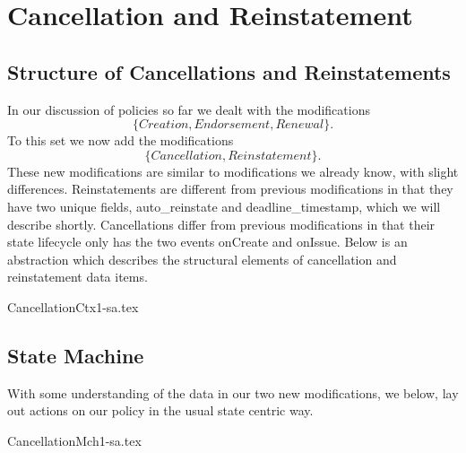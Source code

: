 \chapter{Cancellation and Reinstatement}
\label{intro} %


\section{Structure of Cancellations and Reinstatements}
\label{sec:02:1}
In our discussion of policies so far we dealt with the modifications
\begin{equation*}
  \{Creation, Endorsement, Renewal\}.
\end{equation*}
To this set we now add the modifications
\begin{equation*}
  \{Cancellation, Reinstatement\}.
\end{equation*}
These new modifications are similar to modifications we already
know, with slight differences. Reinstatements are different from previous modifications in that they have two unique
fields, auto\_reinstate and deadline\_timestamp, which we will describe shortly. Cancellations differ from previous
modifications in that their state lifecycle only has the two events onCreate and onIssue. Below is an abstraction which
describes the structural elements of cancellation and reinstatement data items.

{CancellationCtx1-sa.tex}

\section{State Machine}

With some understanding of the data in our two new modifications, we below, lay out actions on our policy in the usual
state centric way. 

{CancellationMch1-sa.tex}

